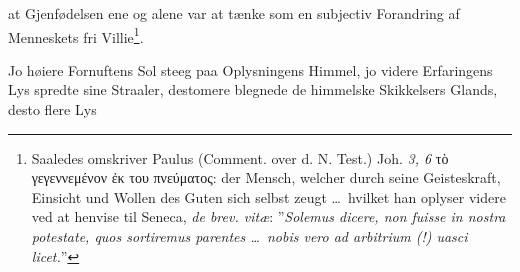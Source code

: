 \documentclass[12pt]{book}
\newcommand{\opage}[1]{\marginnote{\footnotesize\textit{[#1]}}}
\begin{document}
at Gjenfødelsen ene og alene var at tænke som en subjectiv Forandring af
Menneskets fri Villie\footnote{Saaledes omskriver Paulus (Comment. over d. N.
Test.) Joh. \textit{3, 6} τὸ γεγεννεμένον ἐκ του πνεύματος: der Mensch, welcher
durch seine Geisteskraft, Einsicht und Wollen des Guten sich selbst zeugt
\ldots\ hvilket han oplyser videre ved at henvise til Seneca, \textit{de brev.
vitæ}: ”\textit{Solemus dicere, non fuisse in nostra potestate, quos sortiremus
parentes \ldots\ nobis vero ad arbitrium (!) uasci licet.}”}.

Jo høiere Fornuftens Sol steeg paa Oplysningens Himmel, jo videre Erfaringens
Lys spredte sine Straaler, destomere blegnede de himmelske Skikkelsers Glands,
desto flere Lys
\opage{93} %
\end{document}

